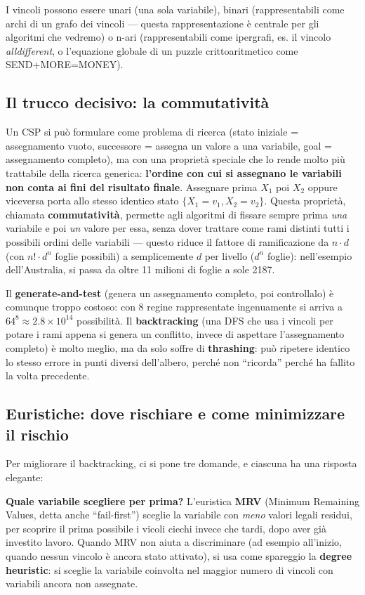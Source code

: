 \documentclass[11pt,a4paper]{article}
\begin{document}
I vincoli possono essere unari (una sola variabile), binari (rappresentabili come archi di un grafo dei vincoli --- questa rappresentazione è centrale per gli algoritmi che vedremo) o n-ari (rappresentabili come ipergrafi, es. il vincolo \emph{alldifferent}, o l'equazione globale di un puzzle crittoaritmetico come SEND+MORE=MONEY).

\subsection{Il trucco decisivo: la commutatività}

Un CSP si può formulare come problema di ricerca (stato iniziale = assegnamento vuoto, successore = assegna un valore a una variabile, goal = assegnamento completo), ma con una proprietà speciale che lo rende molto più trattabile della ricerca generica: \textbf{l'ordine con cui si assegnano le variabili non conta ai fini del risultato finale}. Assegnare prima $X_1$ poi $X_2$ oppure viceversa porta allo stesso identico stato $\{X_1=v_1, X_2=v_2\}$. Questa proprietà, chiamata \textbf{commutatività}, permette agli algoritmi di fissare sempre prima \emph{una} variabile e poi \emph{un} valore per essa, senza dover trattare come rami distinti tutti i possibili ordini delle variabili --- questo riduce il fattore di ramificazione da $n\cdot d$ (con $n!\cdot d^n$ foglie possibili) a semplicemente $d$ per livello ($d^n$ foglie): nell'esempio dell'Australia, si passa da oltre 11 milioni di foglie a sole 2187.

Il \textbf{generate-and-test} (genera un assegnamento completo, poi controllalo) è comunque troppo costoso: con 8 regine rappresentate ingenuamente si arriva a $64^8 \approx 2.8\times 10^{14}$ possibilità. Il \textbf{backtracking} (una DFS che usa i vincoli per potare i rami appena si genera un conflitto, invece di aspettare l'assegnamento completo) è molto meglio, ma da solo soffre di \textbf{thrashing}: può ripetere identico lo stesso errore in punti diversi dell'albero, perché non ``ricorda'' perché ha fallito la volta precedente.

\subsection{Euristiche: dove rischiare e come minimizzare il rischio}

Per migliorare il backtracking, ci si pone tre domande, e ciascuna ha una risposta elegante:

\textbf{Quale variabile scegliere per prima?} L'euristica \textbf{MRV} (Minimum Remaining Values, detta anche ``fail-first'') sceglie la variabile con \emph{meno} valori legali residui, per scoprire il prima possibile i vicoli ciechi invece che tardi, dopo aver già investito lavoro. Quando MRV non aiuta a discriminare (ad esempio all'inizio, quando nessun vincolo è ancora stato attivato), si usa come spareggio la \textbf{degree heuristic}: si sceglie la variabile coinvolta nel maggior numero di vincoli con variabili ancora non assegnate.
\end{document}
